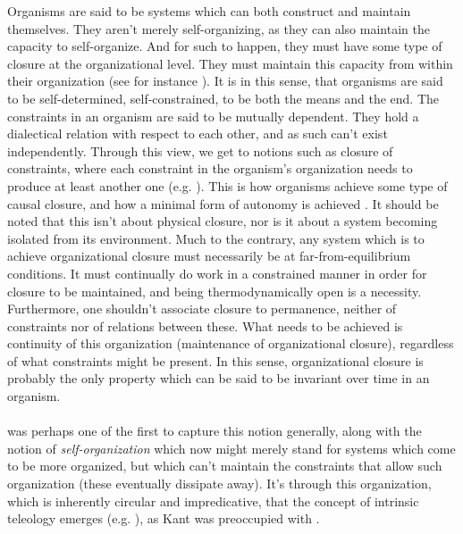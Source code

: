 \documentclass[a4paper,12pt,twoside,leqno]{article}
\begin{document}
Organisms are said to be systems which can both construct and maintain themselves. They aren’t merely self-organizing, as they can also maintain the capacity to self-organize. And for such to happen, they must have some type of closure at the organizational level. They must maintain this capacity from within their organization (see for instance \cite{rosen1991life, maturana2012autopoiesis, varela2025principles, moreno2015biological, kauffman2000investigations, deacon2021molecules}). It is in this sense, that organisms are said to be self-determined, self-constrained, to be both the means and the end. The constraints in an organism are said to be mutually dependent. They hold a dialectical relation with respect to each other, and as such can’t exist independently. Through this view, we get to notions such as closure of constraints, where each constraint in the organism’s organization needs to produce at least another one (e.g. \cite{montevil2015biological, moreno2015biological, mossio2013emergence}). This is how organisms achieve some type of causal closure, and how a minimal form of autonomy is achieved \citep{moreno2015biological}. It should be noted that this isn’t about physical closure, nor is it about a system becoming isolated from its environment. Much to the contrary, any system which is to achieve organizational closure must necessarily be at far-from-equilibrium conditions. It must continually do work in a constrained manner in order for closure to be maintained, and being thermodynamically open is a necessity. Furthermore, one shouldn’t associate closure to permanence, neither of constraints nor of relations between these. What needs to be achieved is continuity of this organization (maintenance of organizational closure), regardless of what constraints might be present. In this sense, organizational closure is probably the only property which can be said to be invariant over time in an organism.

\paragraph*{}

\citet{Kant1790-KANCOJ-2} was perhaps one of the first to capture this notion generally, along with the notion of \textit{self-organization} which now might merely stand for systems which come to be more organized, but which can’t maintain the constraints that allow such organization (these eventually dissipate away).
It's through this organization, which is inherently circular and impredicative, that the concept of intrinsic teleology emerges (e.g. \citet{mossio2017makes, weber2002life, di2005autopoiesis, garcia2024origins, garcia2022naturalisation, jonas2001phenomenon}), as Kant was preoccupied with \citep{Kant1790-KANCOJ-2, weber2002life}.
\end{document}
